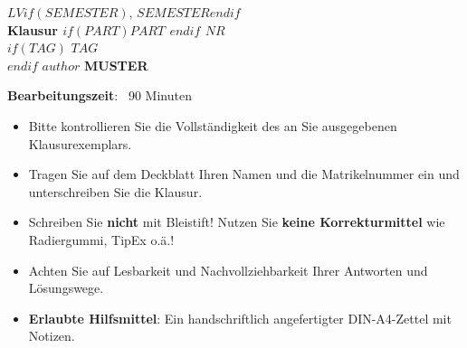 
\begin{coverpages}
    \begin{minipage}[c]{0.75\textwidth}
        \parindent0pt
        \textcolor{headcolor}{\large\scshape{$LV$$if(SEMESTER)$, $SEMESTER$$endif$}}\\[1ex]
        \textcolor{headcolor}{\Large\textbf{Klausur $if(PART)$$PART$ \xspace$endif$ $NR$}}\\[2ex]
        $if(TAG)$
        \textbf{$TAG$}\\[2ex]
        $endif$
        \parindent0pt
        $author$
        \ifprintanswers
            \hfill\textcolor{dkred}{\textbf{\Huge MUSTER}}\hfill\hfill
        \fi
    \end{minipage}
    \begin{minipage}[c]{0.2\textwidth}
        \hslogoscaled{38mm}
    \end{minipage}
    \vspace{10mm}
    \par\hrulefill\par
    \begin{minipage}[c]{0.5\textwidth}
        \begin{minipage}[c]{0.96\textwidth}
        \vspace{2mm}
            {\textbf{Bearbeitungszeit}: {\ }90 Minuten}\par
            \medskip
            \begin{itemize}
            \item Bitte kontrollieren Sie die Vollständigkeit des an Sie 
            ausgegebenen Klausurexemplars.
            \item Tragen Sie auf dem Deckblatt Ihren Namen und die
            Matrikelnummer ein und unterschreiben Sie die Klausur.
            \item Schreiben Sie \textbf{nicht} mit Bleistift! Nutzen Sie
            \textbf{keine Korrekturmittel} wie Radiergummi, TipEx o.ä.!
            \item Achten Sie auf Lesbarkeit und Nachvollziehbarkeit Ihrer 
            Antworten und Lösungswege.
            \item \textbf{Erlaubte Hilfsmittel}: Ein handschriftlich 
            angefertigter DIN-A4-Zettel mit Notizen.
            

\end{itemize}
\end{minipage}
\end{minipage}
\end{coverpages}
